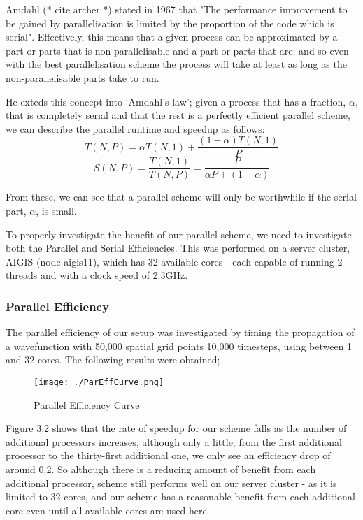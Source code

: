 Amdahl (* cite archer *) stated in 1967 that "The performance improvement to be gained by parallelisation is limited by the proportion of the code which is serial". Effectively, this means that a given process can be approximated by a part or parts that is non-parallelisable and a part or parts that are; and so even with the best parallelisation scheme the process will take at least as long as the non-parallelisable parts take to run. 

He exteds this concept into `Amdahl's law'; given a process that has a fraction, $\alpha$, that is completely serial and that the rest is a perfectly efficient parallel scheme, we can describe the parallel runtime and speedup as follows:
$$
T(N, P)=\alpha T(N, 1)+\frac{(1-\alpha) T(N, 1)}{P}
$$
$$
S(N, P)=\frac{T(N, 1)}{T(N, P)}=\frac{P}{\alpha P+(1-\alpha)}
$$

From these, we can see that a parallel scheme will only be worthwhile if the serial part, $\alpha$, is small. 

To properly investigate the benefit of our parallel scheme, we need to investigate both the Parallel and Serial Efficiencies. This was performed on a server cluster, AIGIS (node aigis11), which has 32 available cores - each capable of running 2 threads and with a clock speed of 2.3GHz. 

\subsubsection{Parallel Efficiency}
The parallel efficiency of our setup was investigated by timing the propagation of a wavefunction with 50,000 spatial grid points 10,000 timesteps, using between 1 and 32 cores. The following results were obtained;

\begin{figure}[H]
         \texttt{[image: ./ParEffCurve.png]}
         \centering
         \caption{Parallel Efficiency Curve}
\end{figure}


Figure 3.2 shows that the rate of speedup for our scheme falls as the number of additional processors increases, although only a little; from the first additional processor to the thirty-first additional one, we only see an efficiency drop of around 0.2. So although there is a reducing amount of benefit from each additional processor, scheme still performs well on our server cluster - as it is limited to 32 cores, and our scheme has a reasonable benefit from each additional core even until all available cores are used here.

